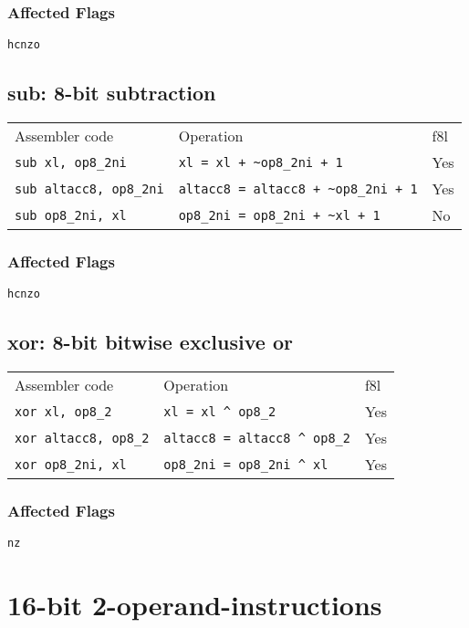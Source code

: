\documentclass{book}
\begin{document}
\subsubsection*{Affected Flags}

\texttt{hcnzo}


\subsection{sub: 8-bit subtraction}

\begin{tabular}{l l l}
Assembler code                 & Operation                                  & f8l \\
\texttt{sub xl, op8\_2ni}      & \texttt{xl = xl + \~{}op8\_2ni + 1}           & Yes \\
\texttt{sub altacc8, op8\_2ni} & \texttt{altacc8 = altacc8 + \~{}op8\_2ni + 1} & Yes \\
\texttt{sub op8\_2ni, xl}      & \texttt{op8\_2ni = op8\_2ni + \~{}xl + 1}     & No
\end{tabular}

\subsubsection*{Affected Flags}

\texttt{hcnzo}


\subsection{xor: 8-bit bitwise exclusive or}

\begin{tabular}{l l l}
Assembler code               & Operation                              & f8l \\
\texttt{xor xl, op8\_2}      & \texttt{xl = xl \^{} op8\_2}           & Yes \\
\texttt{xor altacc8, op8\_2} & \texttt{altacc8 = altacc8 \^{} op8\_2} & Yes \\
\texttt{xor op8\_2ni, xl}    & \texttt{op8\_2ni = op8\_2ni \^{} xl}   & Yes
\end{tabular}

\subsubsection*{Affected Flags}

\texttt{nz}


\section{16-bit 2-operand-instructions}
\end{document}
